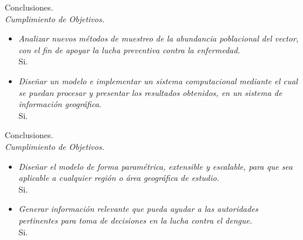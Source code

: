 \begin{frame}[t]{Conclusiones.\\\textit{Cumplimiento de Objetivos.}}
    \begin{center}
        \begin{itemize}
        \item \textit{Analizar nuevos métodos de muestreo de la abundancia poblacional del vector, con el fin de apoyar la lucha preventiva contra la enfermedad.}
        \pause
        \\Si.
        \pause
        \item \textit{Diseñar un modelo e implementar un sistema computacional mediante el cual se puedan procesar y presentar los resultados obtenidos, en un sistema de información geográfica.}
        \pause
        \\Si.
        \end{itemize}
    \end{center}
\end{frame}


\begin{frame}[t]{Conclusiones.\\\textit{Cumplimiento de Objetivos.}}
    \begin{center}
        \begin{itemize}
        \item \textit{Diseñar el modelo de forma paramétrica, extensible y escalable, para que sea aplicable a cualquier región o área geográfica de estudio.}
        \pause
        \\Si.
        \pause
        \item \textit{Generar información relevante que pueda ayudar a las autoridades pertinentes para toma de decisiones en la lucha contra el dengue.}
        \pause
        \\Si.
        \end{itemize}
    \end{center}
\end{frame}
